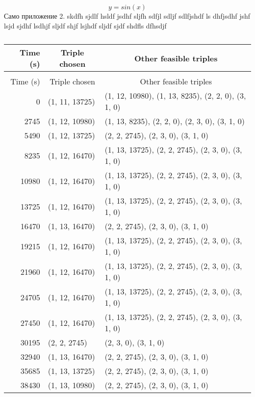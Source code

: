\documentclass[12pt, final, a4paper, oneside]{extarticle}
\begin{document}
\begin{equation}
  \label{eq:4}
  y = sin(x)
\end{equation}
Само приложение 2. skdfh sjdlf hsldf jsdhf sljfh sdfjl sdljf sdlfjshdf ls dhfjsdhf jshf lsjd sjdhf lsdhjf sljdf shjf lsjhdf sljdf sjdf shdfls dfhsdjf 


\setlength\LTleft{0pt}
\setlength\LTright{0pt}
\begin{longtable}{|@{\extracolsep{\fill}} r|*{2}{l|}}
\caption{Feasible triples for 
highly variable Grid, MLMMH} \label{grid_mlmmh}\\
\hline \multicolumn{1}{|p{1cm}|}{Time (s)} & %
\multicolumn{1}{c|}{Triple chosen} & %
\multicolumn{1}{c|}{Other feasible triples} \\
\hline 
\endfirsthead
\captionsetup{labelformat=continued} %
\caption[]{}\\ %
\hline 
\multicolumn{1}{|p{1cm}|}{Time (s)} & %
\multicolumn{1}{c|}{Triple chosen} & %
\multicolumn{1}{c|}{Other feasible triples} \\ 
\hline 
\endhead
\hline
\endfoot
\hline
\endlastfoot

0 & (1, 11, 13725) & (1, 12, 10980), (1, 13, 8235), (2, 2, 0), (3, 1, 0) \\
2745 & (1, 12, 10980) & (1, 13, 8235), (2, 2, 0), (2, 3, 0), (3, 1, 0) \\
5490 & (1, 12, 13725) & (2, 2, 2745), (2, 3, 0), (3, 1, 0) \\
8235 & (1, 12, 16470) & (1, 13, 13725), (2, 2, 2745), (2, 3, 0), (3, 1, 0) \\
10980 & (1, 12, 16470) & (1, 13, 13725), (2, 2, 2745), (2, 3, 0), (3, 1, 0) \\
13725 & (1, 12, 16470) & (1, 13, 13725), (2, 2, 2745), (2, 3, 0), (3, 1, 0) \\
16470 & (1, 13, 16470) & (2, 2, 2745), (2, 3, 0), (3, 1, 0) \\
19215 & (1, 12, 16470) & (1, 13, 13725), (2, 2, 2745), (2, 3, 0), (3, 1, 0) \\
21960 & (1, 12, 16470) & (1, 13, 13725), (2, 2, 2745), (2, 3, 0), (3, 1, 0) \\
24705 & (1, 12, 16470) & (1, 13, 13725), (2, 2, 2745), (2, 3, 0), (3, 1, 0) \\
27450 & (1, 12, 16470) & (1, 13, 13725), (2, 2, 2745), (2, 3, 0), (3, 1, 0) \\
30195 & (2, 2, 2745) & (2, 3, 0), (3, 1, 0) \\
32940 & (1, 13, 16470) & (2, 2, 2745), (2, 3, 0), (3, 1, 0) \\
35685 & (1, 13, 13725) & (2, 2, 2745), (2, 3, 0), (3, 1, 0) \\
38430 & (1, 13, 10980) & (2, 2, 2745), (2, 3, 0), (3, 1, 0) \\
\end{longtable}
\end{document}
